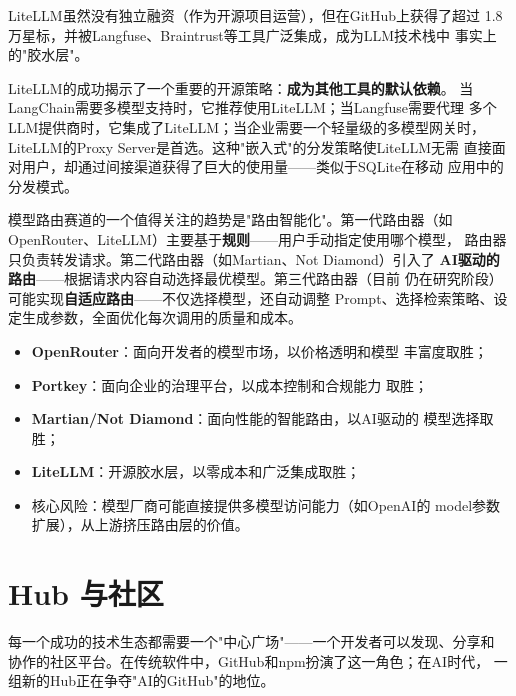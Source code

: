 LiteLLM虽然没有独立融资（作为开源项目运营），但在GitHub上获得了超过
1.8万星标，并被Langfuse、Braintrust等工具广泛集成，成为LLM技术栈中
事实上的"胶水层"。

LiteLLM的成功揭示了一个重要的开源策略：\textbf{成为其他工具的默认依赖}。
当LangChain需要多模型支持时，它推荐使用LiteLLM；当Langfuse需要代理
多个LLM提供商时，它集成了LiteLLM；当企业需要一个轻量级的多模型网关时，
LiteLLM的Proxy Server是首选。这种"嵌入式"的分发策略使LiteLLM无需
直接面对用户，却通过间接渠道获得了巨大的使用量——类似于SQLite在移动
应用中的分发模式。

模型路由赛道的一个值得关注的趋势是"路由智能化"。第一代路由器（如
OpenRouter、LiteLLM）主要基于\textbf{规则}——用户手动指定使用哪个模型，
路由器只负责转发请求。第二代路由器（如Martian、Not Diamond）引入了
\textbf{AI驱动的路由}——根据请求内容自动选择最优模型。第三代路由器（目前
仍在研究阶段）可能实现\textbf{自适应路由}——不仅选择模型，还自动调整
Prompt、选择检索策略、设定生成参数，全面优化每次调用的质量和成本。

\begin{corebox}[模型路由赛道的竞争逻辑]
\begin{itemize}
  \item \textbf{OpenRouter}：面向开发者的模型市场，以价格透明和模型
    丰富度取胜；
  \item \textbf{Portkey}：面向企业的治理平台，以成本控制和合规能力
    取胜；
  \item \textbf{Martian/Not Diamond}：面向性能的智能路由，以AI驱动的
    模型选择取胜；
  \item \textbf{LiteLLM}：开源胶水层，以零成本和广泛集成取胜；
  \item 核心风险：模型厂商可能直接提供多模型访问能力（如OpenAI的
    model参数扩展），从上游挤压路由层的价值。
\end{itemize}
\end{corebox}


\section{Hub 与社区}
\label{sec:platform-hubs}

每一个成功的技术生态都需要一个"中心广场"——一个开发者可以发现、分享和
协作的社区平台。在传统软件中，GitHub和npm扮演了这一角色；在AI时代，
一组新的Hub正在争夺"AI的GitHub"的地位。

